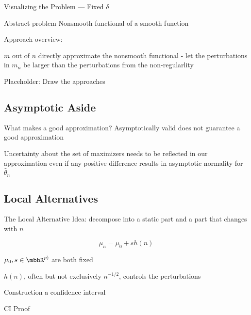 \documentclass[aspectratio=169, professionalfonts]{beamer}
\begin{document}
\begin{frame}{Visualizing the Problem --- Fixed $\delta$}
\end{frame}


\begin{frame}{Abstract problem}
	Nonsmooth functional of a smooth function

	Approach overview:

	$m$ out of $n$ directly approximate the nonsmooth functional - let the
	perturbations in $m_n$ be larger than the perturbations from the non-regularlity
\end{frame}

\begin{frame}{Placeholder: Draw the approaches}
    \end{frame}

\subsection{Asymptotic Aside}

\begin{frame}{What makes a good approximation?}
	Asymptotically valid does not guarantee a good approximation


	Uncertainty about the set of maximizers needs to be reflected in our
	approximation even if any positive difference results in asymptotic
	normality for $\widehat{\theta}_n$
\end{frame}

\subsection{Local Alternatives}
\begin{frame}{The Local Alternative}
	Idea: decompose into a static part and a part that changes with $n$

	$$\mu_n = \mu_0 + s h(n)$$

	$\mu_0, s \in \mbbR^{p)}$ are both fixed

	$h(n)$, often but not exclusively $n^{-1/2}$, controls the perturbations
\end{frame}

\begin{frame}{Construction a confidence interval}
\end{frame}

\begin{frame}{CI Proof}
\end{frame}
\end{document}
